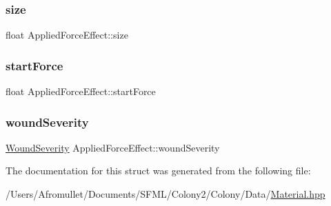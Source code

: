 \mbox{\label{struct_applied_force_effect_aa50dc7f47801c66dc9df54d8fb281cf0}} 
\subsubsection{\texorpdfstring{size}{size}}
{\footnotesize\ttfamily float Applied\+Force\+Effect\+::size}

\mbox{\label{struct_applied_force_effect_a041935c570639c9f1f87e34e114f204e}} 
\subsubsection{\texorpdfstring{start\+Force}{startForce}}
{\footnotesize\ttfamily float Applied\+Force\+Effect\+::start\+Force}

\mbox{\label{struct_applied_force_effect_a5aa8b89ec11b997955d4160b3fb671ec}} 
\subsubsection{\texorpdfstring{wound\+Severity}{woundSeverity}}
{\footnotesize\ttfamily \mbox{\hyperlink{_enum_types_8hpp_a295be2e2d0f307f31ad832b24a7736c6}{Wound\+Severity}} Applied\+Force\+Effect\+::wound\+Severity}



The documentation for this struct was generated from the following file\+:\begin{DoxyCompactItemize}
\item 
/\+Users/\+Afromullet/\+Documents/\+S\+F\+M\+L/\+Colony2/\+Colony/\+Data/\mbox{\hyperlink{_material_8hpp}{Material.\+hpp}}\end{DoxyCompactItemize}
